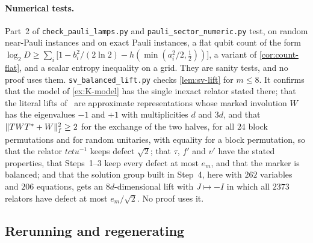 \paragraph{Numerical tests.} Part~2 of \texttt{check\_pauli\_lamps.py} and \texttt{pauli\_sector\_numeric.py} test, on random near-Pauli
instances and on exact Pauli instances, a flat qubit count of the form $\log_2D\ge\sum_i\bigl[1-b_i^2/(2\ln2)-h(\min(a_i^2/2,\frac12))\bigr]$, a
variant of \cref{cor:count-flat}, and a scalar entropy inequality on a grid. They are sanity tests, and no proof uses them.
\texttt{sv\_balanced\_lift.py} checks \cref{lem:sv-lift} for $m\le8$. It confirms that the model of \cref{ex:K-model} has the single
inexact relator stated there; that the literal lifts of~\cite[Prop.~4.8]{Slo19} are approximate representations whose marked involution
$W$ has the eigenvalues $-1$ and $+1$ with multiplicities $d$ and $3d$, and that $\lVert TWT^*+W\rVert_f^2\ge2$ for the exchange of the two halves,
for all $24$ block permutations and for random unitaries, with equality for a block permutation, so that the relator $tctu^{-1}$ keeps
defect $\sqrt2$; that $\tau$, $f'$ and $v'$ have the stated properties, that Steps~1--3 keep every defect at most $e_m$, and that the
marker is balanced; and that the solution group built in Step~4, here with $262$ variables and $206$ equations, gets an $8d$-dimensional
lift with $J\mapsto-I$ in which all $2373$ relators have defect at most $e_m/\sqrt2$. No proof uses it.

\subsection{Rerunning and regenerating}\label{cert:rerun}

